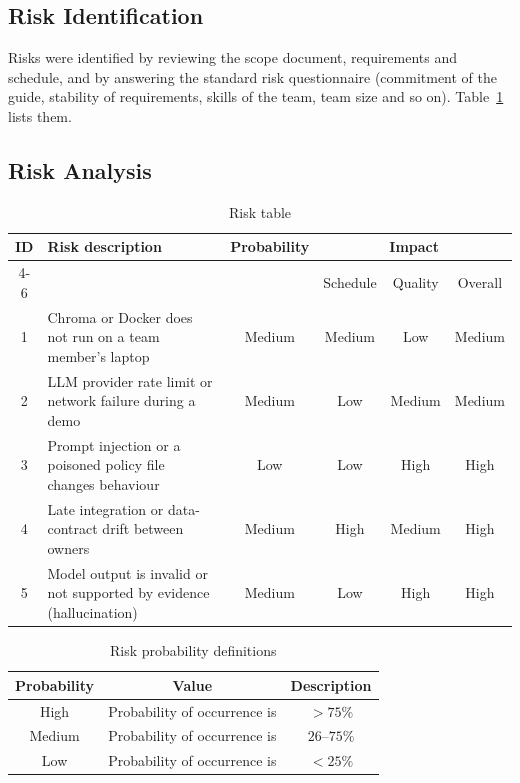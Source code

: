 \documentclass[oneside,a4paper,12pt]{report}
\begin{document}
\subsection{Risk Identification}
Risks were identified by reviewing the scope document, requirements and schedule, and by answering the standard risk questionnaire \cite{bookPressman} (commitment of the guide, stability of requirements, skills of the team, team size and so on). Table~\ref{tab:risk} lists them.

\subsection{Risk Analysis}
\begin{table}[H]
\centering
\begin{tabularx}{\textwidth}{|c|X|c|c|c|c|}
\hline
\multirow{2}{*}{ID} & \multirow{2}{*}{Risk description} & \multirow{2}{*}{Probability} & \multicolumn{3}{c|}{Impact} \\ \cline{4-6}
 & & & Schedule & Quality & Overall \\ \hline
1 & Chroma or Docker does not run on a team member's laptop & Medium & Medium & Low & Medium \\ \hline
2 & LLM provider rate limit or network failure during a demo & Medium & Low & Medium & Medium \\ \hline
3 & Prompt injection or a poisoned policy file changes behaviour & Low & Low & High & High \\ \hline
4 & Late integration or data-contract drift between owners & Medium & High & Medium & High \\ \hline
5 & Model output is invalid or not supported by evidence (hallucination) & Medium & Low & High & High \\ \hline
\end{tabularx}
\caption{Risk table}
\label{tab:risk}
\end{table}

\begin{table}[H]
\centering
\begin{tabular}{|c|c|c|}
\hline
Probability & Value & Description \\ \hline
High & Probability of occurrence is & $> 75\%$ \\ \hline
Medium & Probability of occurrence is & $26$--$75\%$ \\ \hline
Low & Probability of occurrence is & $< 25\%$ \\ \hline
\end{tabular}
\caption{Risk probability definitions \cite{bookPressman}}
\label{tab:riskdef}
\end{table}
\end{document}
